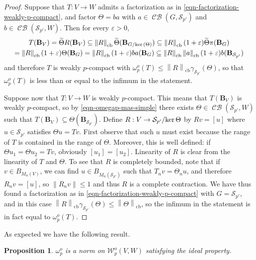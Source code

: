 \documentclass[11pt]{amsart}
\DeclareMathOperator{\cb}{cb}
\DeclareMathOperator{\CB}{\mathcal{CB}}
\newcommand{\n}[1]{ \left\|#1\right\| }
\newtheorem{proposition}[theorem]{Proposition}
\numberwithin{equation}{section}
\def\ker{{\rm ker\, }}
\begin{document}
\begin{proof}
Suppose that $T : V \to W$ admits a factorization as in \eqref{eqn-factorization-weakly-p-compact}, and factor 
 $\Theta = ba$ with $a\in\CB(G,\mathcal{S}_{p'})$ and $b\in\CB(\mathcal{S}_{p'},W)$.
Then for every $\varepsilon>0$,
\begin{multline*}
T(\mathbf{B}_V) = \widetilde{\Theta} R (\mathbf{B}_V) \subseteq \n{R}_{\cb} \widetilde{\Theta}(\mathbf{B}_{G/\ker(\Theta)}) \subseteq  
\n{R}_{\cb} (1+\varepsilon) \widetilde{\Theta} \pi (\mathbf{B}_{G}) \\
=
\n{R}_{\cb} (1+\varepsilon)\Theta(\mathbf{B}_{G}) = 
\n{R}_{\cb} (1+\varepsilon)ba(\mathbf{B}_{G}) \subseteq 
\n{R}_{\cb} \n{a}_{\cb} (1+\varepsilon)b(\mathbf{B}_{\mathcal{S}_{p'}})
\end{multline*}
and therefore $T$ is weakly $p$-compact with $\omega^o_p(T) \le \n{R}_{\cb} \gamma_{\mathcal{S}_{p'}}(\Theta)$, so that $\omega_p^o(T)$ is less than or equal to the infimum in the statement.

Suppose now that $T : V \to W$ is weakly $p$-compact.
This means that $T(\mathbf{B}_V)$ is weakly $p$-compact, so by \eqref{eqn-omegap-mas-simple} there exists $\Theta \in \CB(\mathcal{S}_{p'}, W)$ such that $T(\mathbf{B}_V) \subseteq \Theta(\mathbf{B}_{\mathcal{S}_{p'}})$.
Define $R : V \to \mathcal{S}_{p'}/\ker\Theta$ by $Rv = [u]$ where $u \in \mathcal{S}_{p'}$ satisfies $\Theta u = Tv$.
First observe that such $u$ must exist because the range of $T$ is contained in the range of $\Theta$. Moreover, this is well defined: if $\Theta u_1 = \Theta u_2 = Tv$, obviously $[u_1] = [u_2]$. Linearity of $R$ is clear from the linearity of $T$ and $\Theta$.
To see that $R$ is completely bounded, note that if $v \in B_{M_n(V)}$, we can find $u \in B_{M_n(\mathcal{S}_{p'})}$ such that $T_n v = \Theta_n u$, and therefore
$R_n v = [u]$, so $\n{R_nv} \le 1$ and thus $R$ is a complete contraction.
We have thus found a factorization as in \eqref{eqn-factorization-weakly-p-compact} with $G=\mathcal{S}_{p'}$, and in this case $\n{R}_{\cb}\gamma_{\mathcal{S}_{p'}}(\Theta) \le \n{\Theta}_{\cb}$, so the infimum in the statement is in fact equal to $\omega_p^o(T)$.
\end{proof}

As expected we have the following result.


\begin{proposition}\label{prop-W_p^o-ideal-property}
$\omega^o_p$ is a  norm on  $\mathcal{W}_p^o(V,W)$ satisfying the ideal property.   
\end{proposition}
\end{document}
